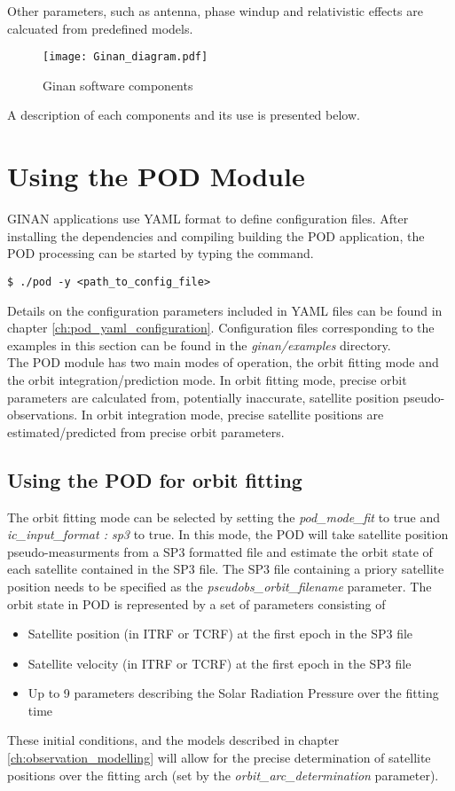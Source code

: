 Other parameters, such as antenna, phase windup and relativistic effects are calcuated from predefined models.   

\begin{figure}
	\centering
	\texttt{[image: Ginan\_diagram.pdf]}
	\caption{Ginan software components}
	\label{fig:PEAnPOD}
\end{figure}

A description of each components and its use is presented below.  \\

\chapter{Using the POD Module}
GINAN applications use YAML format to define configuration files. After installing the dependencies and compiling building the POD application, the POD processing can be started by typing the command.
\begin{verbatim}
$ ./pod -y <path_to_config_file>
\end{verbatim}
Details on the configuration parameters included in YAML files can be found in chapter \ref{ch:pod_yaml_configuration}. Configuration files corresponding to the examples in this section can be found in the \textit{ginan/examples} directory.\\

The POD module has two main modes of operation, the orbit fitting mode and the orbit integration/prediction mode. In orbit fitting mode, precise orbit parameters are calculated from, potentially inaccurate, satellite position pseudo-observations. In orbit integration mode, precise satellite positions are estimated/predicted from precise orbit parameters.\\

\section{Using the POD for orbit fitting}
The orbit fitting mode can be selected by setting the \textit{ pod\_mode\_fit} to true and \textit{ic\_input\_format : sp3} to true. In this mode, the POD will take satellite position pseudo-measurments from a SP3 formatted file and estimate the orbit state of each satellite contained in the SP3 file. The SP3 file containing a priory satellite position needs to be specified as the \textit{pseudobs\_orbit\_filename} parameter.
The orbit state in POD is represented by a set of parameters consisting of 
\begin{itemize}
	\item Satellite position (in ITRF or TCRF) at the first epoch in the SP3 file
	\item Satellite velocity (in ITRF or TCRF) at the first epoch in the SP3 file
	\item Up to 9 parameters describing the Solar Radiation Pressure over the fitting time
\end{itemize}
These initial conditions, and the models described in chapter \ref{ch:observation_modelling} will allow for the precise determination of satellite positions over the fitting arch (set by the \textit{orbit\_arc\_determination} parameter).\\

